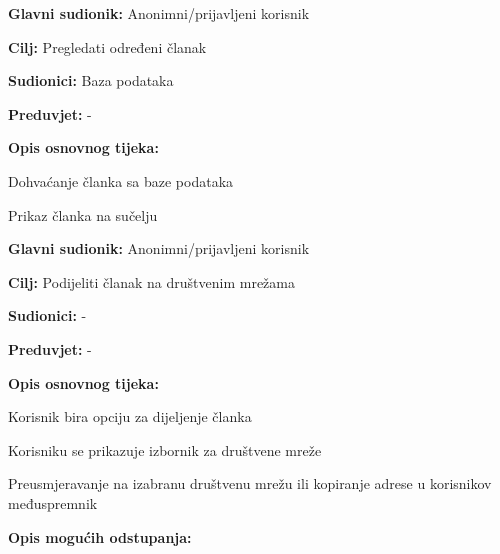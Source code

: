 \noindent {}
\begin{packed_item}

\item \textbf{Glavni sudionik:} Anonimni/prijavljeni korisnik
\item  \textbf{Cilj:} Pregledati određeni članak
\item  \textbf{Sudionici:} Baza podataka
\item  \textbf{Preduvjet:} -
\item  \textbf{Opis osnovnog tijeka:}

\item[] \begin{packed_enum}

    \item Dohvaćanje članka sa baze podataka
    \item Prikaz članka na sučelju

\end{packed_enum}

\end{packed_item}

\noindent {}
\begin{packed_item}

\item \textbf{Glavni sudionik:} Anonimni/prijavljeni korisnik
\item  \textbf{Cilj:} Podijeliti članak na društvenim mrežama
\item  \textbf{Sudionici:} -
\item  \textbf{Preduvjet:} -
\item  \textbf{Opis osnovnog tijeka:}

\item[] \begin{packed_enum}

    \item Korisnik bira opciju za dijeljenje članka
    \item Korisniku se prikazuje izbornik za društvene mreže
    \item Preusmjeravanje na izabranu društvenu mrežu ili kopiranje adrese u korisnikov međuspremnik

\end{packed_enum}

\item  \textbf{Opis mogućih odstupanja:}

\end{packed_item}

